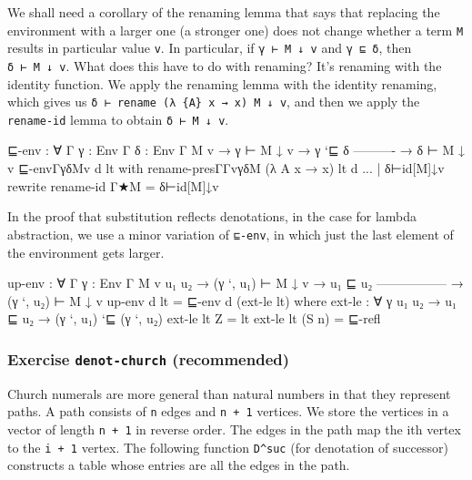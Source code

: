 We shall need a corollary of the renaming lemma that says that replacing
the environment with a larger one (a stronger one) does not change
whether a term \texttt{M} results in particular value \texttt{v}. In
particular, if \texttt{γ\ ⊢\ M\ ↓\ v} and \texttt{γ\ ⊑\ δ}, then
\texttt{δ\ ⊢\ M\ ↓\ v}. What does this have to do with renaming? It's
renaming with the identity function. We apply the renaming lemma with
the identity renaming, which gives us
\texttt{δ\ ⊢\ rename\ (λ\ \{A\}\ x\ →\ x)\ M\ ↓\ v}, and then we apply
the \texttt{rename-id} lemma to obtain \texttt{δ\ ⊢\ M\ ↓\ v}.

\begin{fence}
\begin{code}
⊑-env : ∀ {Γ} {γ : Env Γ} {δ : Env Γ} {M v}
  → γ ⊢ M ↓ v
  → γ `⊑ δ
    ----------
  → δ ⊢ M ↓ v
⊑-env{Γ}{γ}{δ}{M}{v} d lt
      with rename-pres{Γ}{Γ}{v}{γ}{δ}{M} (λ {A} x → x) lt d
... | δ⊢id[M]↓v rewrite rename-id {Γ}{★}{M} =
      δ⊢id[M]↓v
\end{code}
\end{fence}

In the proof that substitution reflects denotations, in the case for
lambda abstraction, we use a minor variation of \texttt{⊑-env}, in which
just the last element of the environment gets larger.

\begin{fence}
\begin{code}
up-env : ∀ {Γ} {γ : Env Γ} {M v u₁ u₂}
  → (γ `, u₁) ⊢ M ↓ v
  → u₁ ⊑ u₂
    -----------------
  → (γ `, u₂) ⊢ M ↓ v
up-env d lt = ⊑-env d (ext-le lt)
  where
  ext-le : ∀ {γ u₁ u₂} → u₁ ⊑ u₂ → (γ `, u₁) `⊑ (γ `, u₂)
  ext-le lt Z = lt
  ext-le lt (S n) = ⊑-refl
\end{code}
\end{fence}

\hypertarget{exercise-denot-church-recommended}{%
\subsubsection{\texorpdfstring{Exercise \texttt{denot-church}
(recommended)}{Exercise denot-church (recommended)}}\label{exercise-denot-church-recommended}}

Church numerals are more general than natural numbers in that they
represent paths. A path consists of \texttt{n} edges and
\texttt{n\ +\ 1} vertices. We store the vertices in a vector of length
\texttt{n\ +\ 1} in reverse order. The edges in the path map the ith
vertex to the \texttt{i\ +\ 1} vertex. The following function
\texttt{D\^{}suc} (for denotation of successor) constructs a table whose
entries are all the edges in the path.

